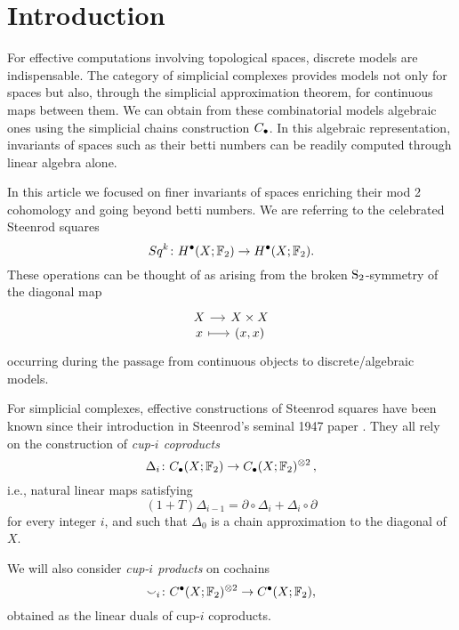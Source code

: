 
\section{Introduction}

For effective computations involving topological spaces, discrete models are indispensable.
The category of simplicial complexes provides models not only for spaces but also, through the simplicial approximation theorem, for continuous maps between them.
We can obtain from these combinatorial models algebraic ones using the simplicial chains construction $\chains$.
In this algebraic representation, invariants of spaces such as their betti numbers can be readily computed through linear algebra alone.

In this article we focused on finer invariants of spaces enriching their mod 2 cohomology and going beyond betti numbers.
We are referring to the celebrated Steenrod squares
\begin{equation*}
Sq^k \colon H^\bullet(X; \F_2) \to H^\bullet(X; \F_2).
\end{equation*}
These operations can be thought of as arising from the broken $\S_2$-symmetry of the diagonal map
\begin{equation*}
\begin{tikzcd}[column sep=small, row sep=-3pt]
X \arrow[r] & X \times X \\
x \arrow[r, mapsto] & (x,x)
\end{tikzcd}
\end{equation*}
occurring during the passage from continuous objects to discrete/algebraic models.

For simplicial complexes, effective constructions of Steenrod squares have been known since their introduction in Steenrod's seminal 1947 paper \cite{steenrod47}.
They all rely on the construction of \textit{cup-$i$ coproducts}
\begin{equation*}
\Delta_i \colon \chains(X; \F_2)  \to \chains(X; \F_2)^{\otimes 2}\,,
\end{equation*}
i.e., natural linear maps satisfying
\begin{equation*}
(1+T) \Delta_{i-1} = \partial \circ \Delta_i + \Delta_i \circ \partial
\end{equation*}
for every integer $i$, and such that $\Delta_0$ is a chain approximation to the diagonal of $X$.

We will also consider \textit{cup-$i$ products} on cochains
\begin{equation*}
\smallsmile_i \colon \cochains(X; \F_2)^{\otimes 2} \to \cochains(X; \F_2),
\end{equation*}
obtained as the linear duals of cup-$i$ coproducts.


